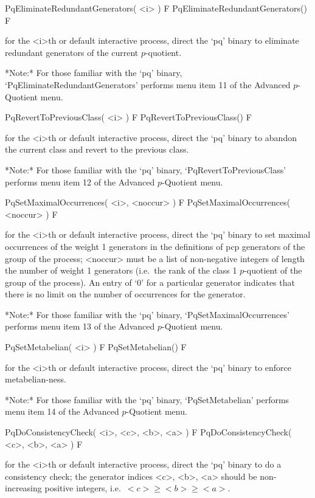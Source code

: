 \>PqEliminateRedundantGenerators( <i> ) F
\>PqEliminateRedundantGenerators() F

for the <i>th or default interactive {\ANUPQ} process, direct  the  `pq'
binary to eliminate redundant generators of the current $p$-quotient.

*Note:* 
For those familiar with the `pq' binary, `PqEliminateRedundantGenerators'
performs menu item 11 of the Advanced $p$-Quotient menu.

\>PqRevertToPreviousClass( <i> ) F
\>PqRevertToPreviousClass() F

for the <i>th or default interactive {\ANUPQ} process, direct  the  `pq'
binary to abandon the current class and revert to the previous class.

*Note:*
For  those  familiar  with  the  `pq'  binary,  `PqRevertToPreviousClass'
performs menu item 12 of the Advanced $p$-Quotient menu.

\>PqSetMaximalOccurrences( <i>, <noccur> ) F
\>PqSetMaximalOccurrences( <noccur> ) F

for the <i>th or default interactive {\ANUPQ} process, direct  the  `pq'
binary to set maximal occurrences of  the  weight  1  generators  in  the
definitions of pcp generators of the group of the process; <noccur>  must
be a list of non-negative integers of  length  the  number  of  weight  1
generators (i.e.~the rank of the class 1 $p$-quotient of the group of the
process). An entry of `0' for a particular generator indicates that there
is no limit on the number of occurrences for the generator.

*Note:*
For  those  familiar  with  the  `pq'  binary,  `PqSetMaximalOccurrences'
performs menu item 13 of the Advanced $p$-Quotient menu.

\>PqSetMetabelian( <i> ) F
\>PqSetMetabelian() F

for the <i>th or default interactive {\ANUPQ} process, direct  the  `pq'
binary to enforce metabelian-ness.

*Note:* 
For those familiar  with  the  `pq'  binary,  `PqSetMetabelian'  performs
menu item 14 of the Advanced $p$-Quotient menu.

\>PqDoConsistencyCheck( <i>, <c>, <b>, <a> ) F
\>PqDoConsistencyCheck( <c>, <b>, <a> ) F

for the <i>th or default interactive {\ANUPQ} process, direct  the  `pq'
binary to do a consistency check; the generator  indices  <c>,  <b>,  <a>
should be non-increasing positive integers, i.e.~$<c> \ge <b> \ge <a>$.

